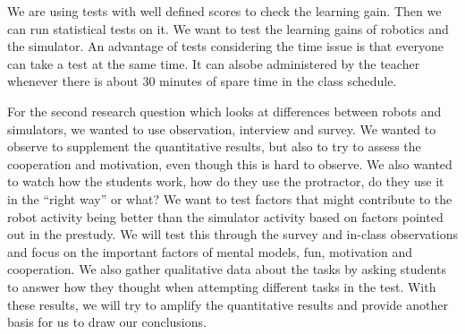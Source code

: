 \bigskip\noindent
We are using tests with well defined scores to check the learning gain. Then we can run statistical tests on it. We want to test the learning gains of robotics and the simulator. An advantage of tests considering the time issue is that everyone can take a test at the same time. It can alsobe administered by the teacher whenever there is about 30 minutes of spare time in the class schedule.

\bigskip\noindent
For the second research question which looks at differences between robots and simulators,  we wanted to use observation, interview and survey. We wanted to observe to supplement the quantitative results, but also to try to assess the cooperation and motivation, even though this is hard to observe. We also wanted to watch how the students work, how do they use the protractor, do they use it in the “right way” or what? We want to test factors that might contribute to the robot activity being better than the simulator activity based on factors pointed out in the prestudy. We will test this through the survey and in-class observations and focus on the important factors of mental models, fun, motivation and cooperation. We also gather qualitative data about the tasks by asking students to answer how they thought when attempting different tasks in the test. With these results, we will try to amplify the quantitative results and provide another basis for us to draw our conclusions. 


